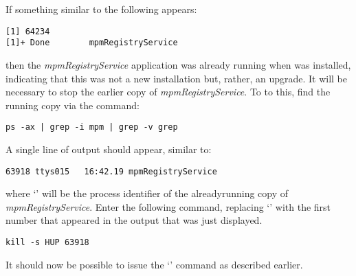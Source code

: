 If something similar to the following appears:
\outputBegin
\begin{verbatim}
[1] 64234
[1]+ Done        mpmRegistryService
\end{verbatim}
\outputEnd{}
then the \emph{mpmRegistryService} application was already running when \mplusm{} was
installed, indicating that this was not a new installation but, rather, an upgrade.
\condPage{}
It will be necessary to stop the earlier copy of \emph{mpmRegistryService}.
To to this, find the running copy via the command:
\outputBegin
\begin{verbatim}
ps -ax | grep -i mpm | grep -v grep
\end{verbatim}
\outputEnd{}
A single line of output should appear, similar to:
\outputBegin
\begin{verbatim}
63918 ttys015   16:42.19 mpmRegistryService
\end{verbatim}
\outputEnd{}
where `' will be the process identifier of the already\longDash{}running
copy of \emph{mpmRegistryService}.
Enter the following command, replacing `' with the first number that
appeared in the output that was just displayed.
\outputBegin
\begin{verbatim}
kill -s HUP 63918
\end{verbatim}
\outputEnd{}
It should now be possible to issue the `' command as
described earlier.\\

